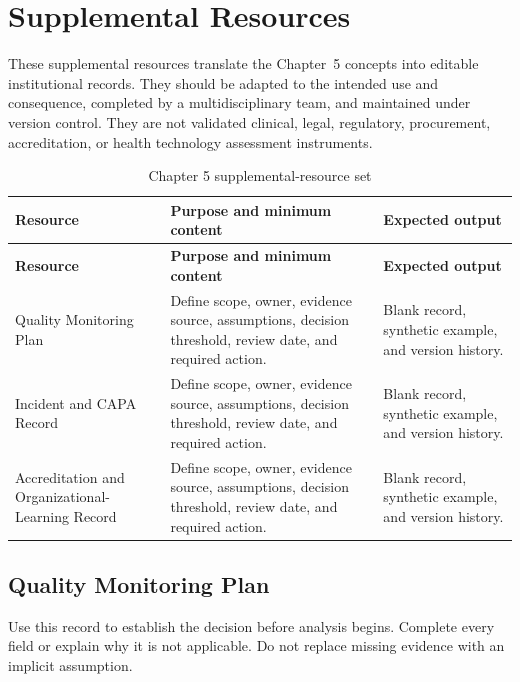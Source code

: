 \section{Supplemental Resources}
\label{sec:comp-ch05-supplemental}

These supplemental resources translate the Chapter~5 concepts into editable
institutional records. They should be adapted to the intended use and consequence,
completed by a multidisciplinary team, and maintained under version control. They
are not validated clinical, legal, regulatory, procurement, accreditation, or health
technology assessment instruments.

\begin{longtable}{@{}p{}p{}p{}@{}}
\caption{Chapter 5 supplemental-resource set}
\label{tab:comp-ch05-supplemental-set}\\
\toprule
\textbf{Resource} & \textbf{Purpose and minimum content} & \textbf{Expected output} \\
\midrule
\endfirsthead
\toprule
\textbf{Resource} & \textbf{Purpose and minimum content} & \textbf{Expected output} \\
\midrule
\endhead
\bottomrule
\endlastfoot
Quality Monitoring Plan & Define scope, owner, evidence source, assumptions, decision threshold, review date, and required action. & Blank record, synthetic example, and version history. \\
Incident and CAPA Record & Define scope, owner, evidence source, assumptions, decision threshold, review date, and required action. & Blank record, synthetic example, and version history. \\
Accreditation and Organizational-Learning Record & Define scope, owner, evidence source, assumptions, decision threshold, review date, and required action. & Blank record, synthetic example, and version history. \\
\end{longtable}

\subsection{Quality Monitoring Plan}
\label{sec:comp-ch05-supp-1}
Use this record to establish the decision before analysis begins. Complete every
field or explain why it is not applicable. Do not replace missing evidence with an
implicit assumption.

